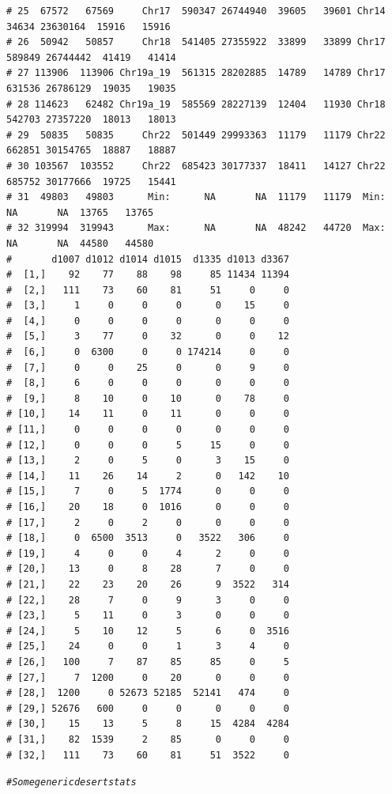 \documentclass{article}\usepackage[]{graphicx}\usepackage[]{color}
\makeatletter
\newcommand{\hlcom}[1]{\textcolor[rgb]{0.678,0.584,0.686}{\textit{#1}}}%
\newenvironment{kframe}{%
 \def\at@end@of@kframe{}%
 \ifinner\ifhmode%
  \def\at@end@of@kframe{\end{minipage}}%
  \begin{minipage}{\columnwidth}%
 \fi\fi%
 \def\FrameCommand##1{\hskip\@totalleftmargin \hskip-\fboxsep
 \colorbox{shadecolor}{##1}\hskip-\fboxsep
     \hskip-\linewidth \hskip-\@totalleftmargin \hskip\columnwidth}%
 \MakeFramed {\advance\hsize-\width
   \@totalleftmargin\z@ \linewidth\hsize
   \@setminipage}}%
 {\par\unskip\endMakeFramed%
 \at@end@of@kframe}
\newenvironment{knitrout}{}{} %
\makeatother
\begin{document}
\begin{knitrout}
\begin{kframe}
\begin{verbatim}
# 25  67572   67569     Chr17  590347 26744940  39605   39601 Chr14   34634 23630164  15916   15916
# 26  50942   50857     Chr18  541405 27355922  33899   33899 Chr17  589849 26744442  41419   41414
# 27 113906  113906 Chr19a_19  561315 28202885  14789   14789 Chr17  631536 26786129  19035   19035
# 28 114623   62482 Chr19a_19  585569 28227139  12404   11930 Chr18  542703 27357220  18013   18013
# 29  50835   50835     Chr22  501449 29993363  11179   11179 Chr22  662851 30154765  18887   18887
# 30 103567  103552     Chr22  685423 30177337  18411   14127 Chr22  685752 30177666  19725   15441
# 31  49803   49803      Min:      NA       NA  11179   11179  Min:      NA       NA  13765   13765
# 32 319994  319943      Max:      NA       NA  48242   44720  Max:      NA       NA  44580   44580
#       d1007 d1012 d1014 d1015  d1335 d1013 d3367
#  [1,]    92    77    88    98     85 11434 11394
#  [2,]   111    73    60    81     51     0     0
#  [3,]     1     0     0     0      0    15     0
#  [4,]     0     0     0     0      0     0     0
#  [5,]     3    77     0    32      0     0    12
#  [6,]     0  6300     0     0 174214     0     0
#  [7,]     0     0    25     0      0     9     0
#  [8,]     6     0     0     0      0     0     0
#  [9,]     8    10     0    10      0    78     0
# [10,]    14    11     0    11      0     0     0
# [11,]     0     0     0     0      0     0     0
# [12,]     0     0     0     5     15     0     0
# [13,]     2     0     5     0      3    15     0
# [14,]    11    26    14     2      0   142    10
# [15,]     7     0     5  1774      0     0     0
# [16,]    20    18     0  1016      0     0     0
# [17,]     2     0     2     0      0     0     0
# [18,]     0  6500  3513     0   3522   306     0
# [19,]     4     0     0     4      2     0     0
# [20,]    13     0     8    28      7     0     0
# [21,]    22    23    20    26      9  3522   314
# [22,]    28     7     0     9      3     0     0
# [23,]     5    11     0     3      0     0     0
# [24,]     5    10    12     5      6     0  3516
# [25,]    24     0     0     1      3     4     0
# [26,]   100     7    87    85     85     0     5
# [27,]     7  1200     0    20      0     0     0
# [28,]  1200     0 52673 52185  52141   474     0
# [29,] 52676   600     0     0      0     0     0
# [30,]    15    13     5     8     15  4284  4284
# [31,]    82  1539     2    85      0     0     0
# [32,]   111    73    60    81     51  3522     0
\end{verbatim}
\begin{alltt}
  \hlcom{# Some generic desert stats}

\end{alltt}
\end{kframe}
\end{knitrout}
\end{document}
